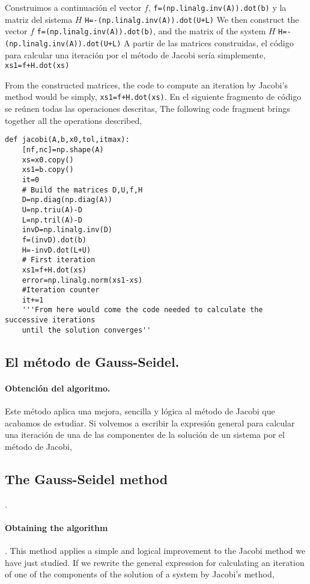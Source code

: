 \begin{paracol}{2}
Construimos a continuación el vector $f$, \texttt{f=(np.linalg.inv(A)).dot(b)} y la matriz del sistema $H$ \texttt{H=-(np.linalg.inv(A)).dot(U+L)}
\switchcolumn
We then construct the vector $f$ \texttt{f=(np.linalg.inv(A)).dot(b)}, and the matrix of the system $H$ \texttt{H=-(np.linalg.inv(A)).dot(U+L)}
\switchcolumn
A partir de las matrices construidas, el código para calcular una iteración por el método de Jacobi sería simplemente, \texttt{xs1=f+H.dot(xs)}
\switchcolumn

From the constructed matrices, the code to compute an iteration by Jacobi's method would be simply, \texttt{xs1=f+H.dot(xs)}.
\switchcolumn
En el siguiente fragmento de código se reúnen todas las operaciones descritas,
\switchcolumn
The following code fragment brings together all the operations described,
\end{paracol}
\begin{verbatim}
def jacobi(A,b,x0,tol,itmax):
    [nf,nc]=np.shape(A)
    xs=x0.copy()
    xs1=b.copy()
    it=0
    # Build the matrices D,U,f,H
    D=np.diag(np.diag(A))
    U=np.triu(A)-D
    L=np.tril(A)-D
    invD=np.linalg.inv(D)
    f=(invD).dot(b)
    H=-invD.dot(L+U)
    # First iteration
    xs1=f+H.dot(xs)
    error=np.linalg.norm(xs1-xs)
    #Iteration counter
    it+=1
    '''From here would come the code needed to calculate the successive iterations 
    until the solution converges''

\end{verbatim}

\begin{paracol}{2}
\subsection{El método de Gauss-Seidel.} 
\paragraph{Obtención del algoritmo.} Este método aplica una mejora, sencilla y lógica al método de Jacobi que acabamos de estudiar. Si volvemos a escribir la expresión general para calcular una iteración de una de las componentes de la solución de un sistema por el método de Jacobi,
\switchcolumn
\subsection{The Gauss-Seidel method}. 
\paragraph{Obtaining the algorithm}. This method applies a simple and logical improvement to the Jacobi method we have just studied. If we rewrite the general expression for calculating an iteration of one of the components of the solution of a system by Jacobi's method,
\end{paracol}

